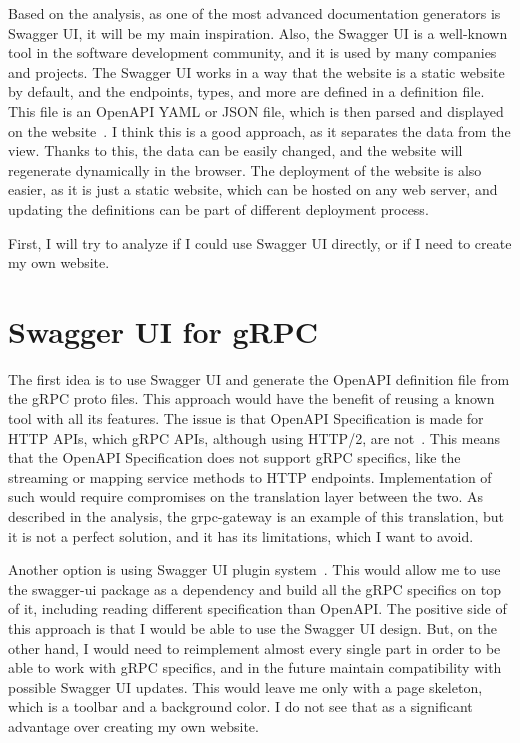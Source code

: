 Based on the analysis, as one of the most advanced documentation generators is Swagger UI, it will be my main inspiration.
Also, the Swagger UI is a well-known tool in the software development community, and it is used by many companies and projects.
The Swagger UI works in a way that the website is a static website by default, and the endpoints, types, and more are defined in a definition file.
This file is an OpenAPI YAML or JSON file, which is then parsed and displayed on the website~\cite{swagger-ui-definition-file}.
I think this is a good approach, as it separates the data from the view.
Thanks to this, the data can be easily changed, and the website will regenerate dynamically in the browser.
The deployment of the website is also easier, as it is just a static website, which can be hosted on any web server, and updating the definitions can be part of different deployment process.

First, I will try to analyze if I could use Swagger UI directly, or if I need to create my own website.


\section{Swagger UI for gRPC}
The first idea is to use Swagger UI and generate the OpenAPI definition file from the gRPC proto files.
This approach would have the benefit of reusing a known tool with all its features.
The issue is that OpenAPI Specification is made for HTTP APIs, which gRPC APIs, although using HTTP/2, are not~\cite{openapi-specification}.
This means that the OpenAPI Specification does not support gRPC specifics, like the streaming or mapping service methods to HTTP endpoints.
Implementation of such would require compromises on the translation layer between the two.
As described in the analysis, the grpc-gateway is an example of this translation, but it is not a perfect solution, and it has its limitations, which I want to avoid.

Another option is using Swagger UI plugin system~\cite{swagger-ui-plugins}.
This would allow me to use the swagger-ui package as a dependency and build all the gRPC specifics on top of it, including reading different specification than OpenAPI\@.
The positive side of this approach is that I would be able to use the Swagger UI design.
But, on the other hand, I would need to reimplement almost every single part in order to be able to work with gRPC specifics, and in the future maintain compatibility with possible Swagger UI updates.
This would leave me only with a page skeleton, which is a toolbar and a background color.
I do not see that as a significant advantage over creating my own website.

